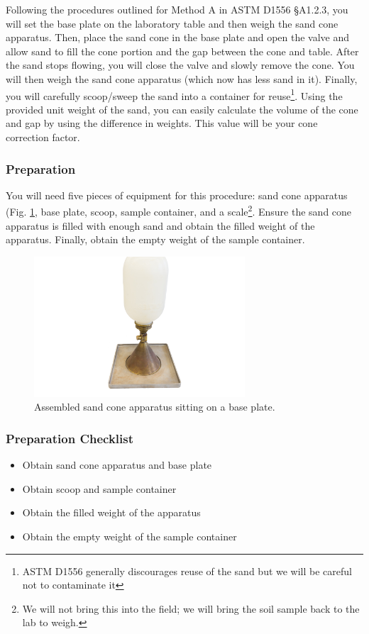 \documentclass[12pt]{article}
\begin{document}
Following the procedures outlined for Method A in ASTM D1556 \S A1.2.3, you will set the base plate on the laboratory table and then weigh the sand cone apparatus. Then, place the sand cone in the base plate and open the valve and allow sand to fill the cone portion and the gap between the cone and table. After the sand stops flowing, you will close the valve and slowly remove the cone. You will then weigh the sand cone apparatus (which now has less sand in it). Finally, you will carefully scoop/sweep the sand into a container for reuse\footnote{ASTM D1556 generally discourages reuse of the sand but we will be careful not to contaminate it}. Using the provided unit weight of the sand, you can easily calculate the volume of the cone and gap by using the difference in weights. This value will be your cone correction factor.

\subsubsection{Preparation}
You will need five pieces of equipment for this procedure: sand cone apparatus (Fig. \ref{fig:sandcone}, base plate, scoop, sample container, and a scale\footnote{We will not bring this into the field; we will bring the soil sample back to the lab to weigh.}. Ensure the sand cone apparatus is filled with enough sand and obtain the filled weight of the apparatus. Finally, obtain the empty weight of the sample container.

\begin{figure}[H]
    \centering
    \includegraphics[width=0.7\textwidth]{GEO_5760.jpg}
    \caption{Assembled sand cone apparatus sitting on a base plate.}
    \label{fig:sandcone}
\end{figure}

\subsubsection*{Preparation Checklist}
\begin{itemize}
    \item Obtain sand cone apparatus and base plate
    \item Obtain scoop and sample container
    \item Obtain the filled weight of the apparatus
    \item Obtain the empty weight of the sample container
\end{itemize}
\end{document}
